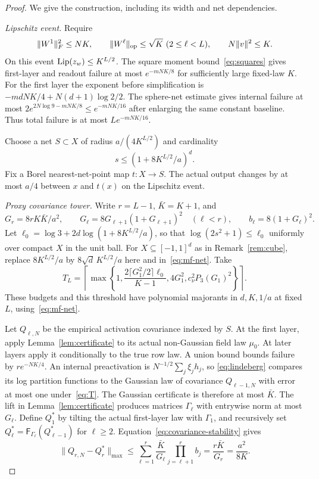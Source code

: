 \begin{proof}
We give the construction, including its width and net dependencies.

\emph{Lipschitz event.}
Require
\[
 \|W^1\|_F^2\leq NK,\qquad
 \|W^\ell\|_{\rm op}\leq\sqrt K\ (2\leq\ell<L),\qquad
 N\|v\|^2\leq K.
\]
On this event $\mathrm{Lip}(z_w)\leq K^{L/2}$. The square moment
bound~\eqref{eq:squares} gives first-layer and readout failure at most
$e^{-mNK/8}$ for sufficiently large fixed-law $K$. For the first layer
the exponent before simplification is
$-mdNK/4+N(d+1)\log2/2$.
The sphere-net estimate gives internal failure at most
$2e^{2N\log9-mNK/8}\leq e^{-mNK/16}$ after enlarging the same
constant baseline. Thus total failure is at most $Le^{-mNK/16}$.

Choose a net $S\subset X$ of radius $a/(4K^{L/2})$ and cardinality
\begin{equation}\label{eq:mf-net}
 s\leq(1+8K^{L/2}/a)^d.
\end{equation}
Fix a Borel nearest-net-point map $t:X\to S$. The actual output changes
by at most $a/4$ between $x$ and $t(x)$ on the Lipschitz event.

\emph{Proxy covariance tower.}
Write $r=L-1$, $\bar K=K+1$, and
\[
 G_r=8rK\bar K/a^2,\qquad
 G_\ell=8G_{\ell+1}(1+G_{\ell+1})^2\quad(\ell<r),\qquad
 b_\ell=8(1+G_\ell)^2.
\]
Let $\ell_0=\log3+2d\log(1+8K^{L/2}/a)$, so that
$\log(2s^2+1)\leq\ell_0$ uniformly over compact $X$ in the unit ball. For
$X\subseteq[-1,1]^d$ as in Remark~\ref{rem:cube}, replace $8K^{L/2}/a$ by
$8\sqrt d\,K^{L/2}/a$ here and in~\eqref{eq:mf-net}. Take
\begin{equation}\label{eq:T}
 T_L=\left\lceil\max\left\{1,
 \frac{2\lceil G_1^2/2\rceil\ell_0}{K-1},
 4G_1^2,c_\nu^2P_3(G_1)^2\right\}\right\rceil.
\end{equation}
These budgets and this threshold have polynomial majorants in
$d,K,1/a$ at fixed $L$, using~\eqref{eq:mf-net}.

Let $Q_{\ell,N}$ be the empirical activation covariance indexed by $S$.
At the first layer, apply Lemma~\ref{lem:certificate} to its actual
non-Gaussian field law $\mu_0$. At later layers apply it conditionally
to the true row law. A union bound bounds failure by $r e^{-NK/4}$.
An internal preactivation is $N^{-1/2}\sum_j\xi_jh_j$, so
\eqref{eq:lindeberg} compares its log partition functions to the Gaussian
law of covariance $Q_{\ell-1,N}$ with error at most one under~\eqref{eq:T}.
The Gaussian certificate is therefore at most $\bar K$.
The lift in Lemma~\ref{lem:certificate} produces matrices $\Gamma_\ell$
with entrywise norm at most $G_\ell$. Define $Q_1^*$ by tilting the
actual first-layer law with $\Gamma_1$, and recursively set
$Q_\ell^*=\mathsf F_{\Gamma_\ell}(Q_{\ell-1}^*)$ for $\ell\geq2$.
Equation~\eqref{eq:covariance-stability} gives
\[
 \|Q_{r,N}-Q_r^*\|_{\max}
 \leq\sum_{\ell=1}^r\frac{\bar K}{G_\ell}
                     \prod_{j=\ell+1}^r b_j
 =\frac{r\bar K}{G_r}=\frac{a^2}{8K}.
\]


\end{proof}
